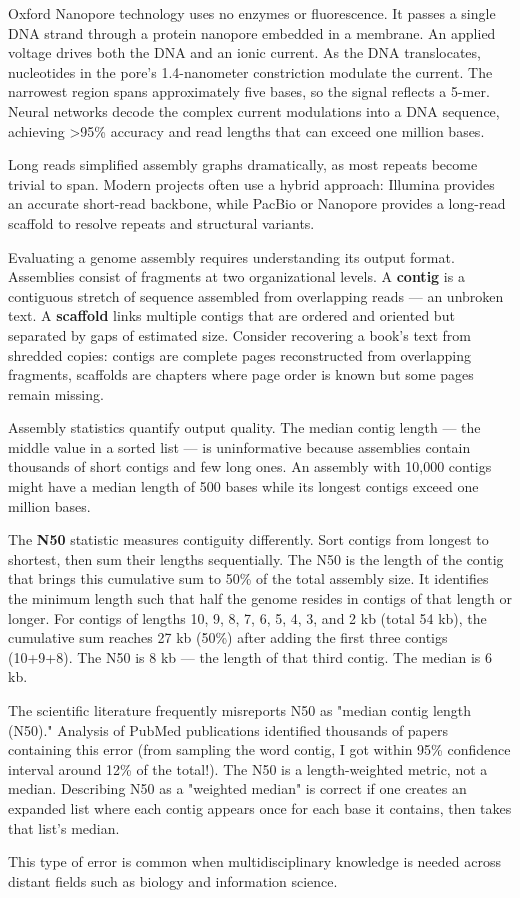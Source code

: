 Oxford Nanopore technology uses no enzymes or fluorescence. It passes a single DNA strand through a protein nanopore embedded in a membrane. An applied voltage drives both the DNA and an ionic current. As the DNA translocates, nucleotides in the pore's 1.4-nanometer constriction modulate the current. The narrowest region spans approximately five bases, so the signal reflects a 5-mer. Neural networks decode the complex current modulations into a DNA sequence, achieving >95\% accuracy and read lengths that can exceed one million bases.

Long reads simplified assembly graphs dramatically, as most repeats become trivial to span. Modern projects often use a hybrid approach: Illumina provides an accurate short-read backbone, while PacBio or Nanopore provides a long-read scaffold to resolve repeats and structural variants.
\newpage
\begin{commentary}
Evaluating a genome assembly requires understanding its output format. Assemblies consist of fragments at two organizational levels. A \textbf{contig} is a contiguous stretch of sequence assembled from overlapping reads — an unbroken text. A \textbf{scaffold} links multiple contigs that are ordered and oriented but separated by gaps of estimated size. Consider recovering a book's text from shredded copies: contigs are complete pages reconstructed from overlapping fragments, scaffolds are chapters where page order is known but some pages remain missing.

Assembly statistics quantify output quality. The median contig length — the middle value in a sorted list — is uninformative because assemblies contain thousands of short contigs and few long ones. An assembly with 10,000 contigs might have a median length of 500 bases while its longest contigs exceed one million bases.

The \textbf{N50} statistic measures contiguity differently. Sort contigs from longest to shortest, then sum their lengths sequentially. The N50 is the length of the contig that brings this cumulative sum to 50\% of the total assembly size. It identifies the minimum length such that half the genome resides in contigs of that length or longer. For contigs of lengths 10, 9, 8, 7, 6, 5, 4, 3, and 2 kb (total 54 kb), the cumulative sum reaches 27 kb (50\%) after adding the first three contigs (10+9+8). The N50 is 8 kb — the length of that third contig. The median is 6 kb.

The scientific literature frequently misreports N50 as "median contig length (N50)." Analysis of PubMed publications identified thousands of papers containing this error (from sampling the word contig, I got within 95\% confidence interval around 12\% of the total!). The N50 is a length-weighted metric, not a median. Describing N50 as a "weighted median" is correct if one creates an expanded list where each contig appears once for each base it contains, then takes that list's median.

This type of error is common when multidisciplinary knowledge is needed across distant fields such as biology and information science.
\end{commentary}

